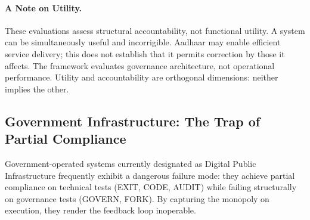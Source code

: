 \documentclass{article}
\begin{document}
\paragraph{A Note on Utility.} These evaluations assess structural accountability, not functional utility. A system can be simultaneously useful and incorrigible. Aadhaar may enable efficient service delivery; this does not establish that it permits correction by those it affects. The framework evaluates governance architecture, not operational performance. Utility and accountability are orthogonal dimensions: neither implies the other.

\subsection{Government Infrastructure: The Trap of Partial Compliance}

Government-operated systems currently designated as Digital Public Infrastructure frequently exhibit a dangerous failure mode: they achieve partial compliance on technical tests (EXIT, CODE, AUDIT) while failing structurally on governance tests (GOVERN, FORK). By capturing the monopoly on execution, they render the feedback loop inoperable.
\end{document}

